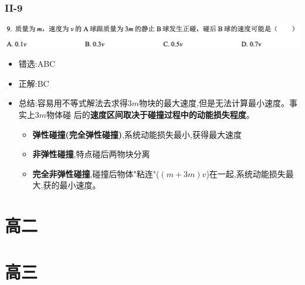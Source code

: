 \documentclass{article}
\begin{document}
    \subsubsection{II-9}
    \includegraphics{./pictures/1.1-2.png}

    \begin{itemize}
        \item 错选:\quad ABC
        \item 正解:\quad BC    
        \item 总结:\quad 容易用不等式解法去求得$3m$物块的最大速度,但是无法计算最小速度。事实上$3m$物体碰
        后的\textbf{速度区间取决于碰撞过程中的动能损失程度}。
        \begin{itemize}
            \item \textbf{弹性碰撞(完全弹性碰撞)},系统动能损失最小,获得最大速度
            \item \textbf{非弹性碰撞},特点碰后两物块分离
            \item \textbf{完全非弹性碰撞},碰撞后物体"粘连"($(m+3m)v$)在一起,系统动能损失最大,获的最小速度。
        \end{itemize}
    \end{itemize}



    \section{高二}





    \section{高三}
\end{document}
